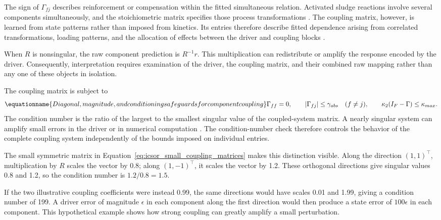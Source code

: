 The sign of \(\Gamma_{fj}\) describes reinforcement or compensation within the fitted simultaneous relation. Activated sludge reactions involve several components simultaneously, and the stoichiometric matrix specifies those process transformations \citep{Henze2006}. The coupling matrix, however, is learned from state patterns rather than imposed from kinetics. Its entries therefore describe fitted dependence arising from correlated transformations, loading patterns, and the allocation of effects between the driver and coupling blocks \citep{Selerio2026}.

When \(R\) is nonsingular, the raw component prediction is \(R^{-1}r\). This multiplication can redistribute or amplify the response encoded by the driver. Consequently, interpretation requires examination of the driver, the coupling matrix, and their combined raw mapping rather than any one of these objects in isolation.

The coupling matrix is subject to
\begin{equation}
\equationname{Diagonal, magnitude, and conditioning safeguards for component coupling}
\label{eq:icsor_coupling_safeguards}
\Gamma_{ff}=0,
\qquad |\Gamma_{fj}|\leq\gamma_{abs}\quad(f\neq j),
\qquad \kappa_2(I_F-\Gamma)\leq\kappa_{max}.
\end{equation}
The condition number is the ratio of the largest to the smallest singular value of the coupled-system matrix. A nearly singular system can amplify small errors in the driver or in numerical computation \citep{BuzziFerraris2013}. The condition-number check therefore controls the behavior of the complete coupling system independently of the bounds imposed on individual entries.

The small symmetric matrix in Equation~\eqref{eq:icsor_small_coupling_matrices} makes this distinction visible. Along the direction \((1,1)^\top\), multiplication by \(R\) scales the vector by 0.8; along \((1,-1)^\top\), it scales the vector by 1.2. These orthogonal directions give singular values 0.8 and 1.2, so the condition number is \(1.2/0.8=1.5\).

If the two illustrative coupling coefficients were instead 0.99, the same directions would have scales 0.01 and 1.99, giving a condition number of 199. A driver error of magnitude \(\epsilon\) in each component along the first direction would then produce a state error of \(100\epsilon\) in each component. This hypothetical example shows how strong coupling can greatly amplify a small perturbation.

